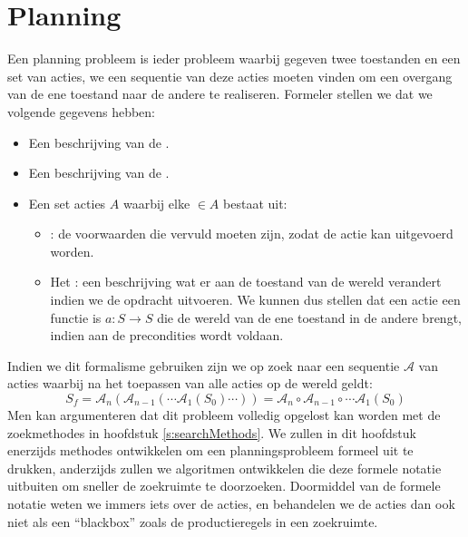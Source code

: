 \chapter{Planning}
\label{s:planning}
Een planning probleem is ieder probleem waarbij gegeven twee toestanden en een set van acties, we een sequentie van deze acties moeten vinden om een overgang van de ene toestand naar de andere te realiseren. Formeler stellen we dat we volgende gegevens hebben:
\begin{itemize}
 \item Een beschrijving van de .
 \item Een beschrijving van de .
 \item Een set acties $A$ waarbij elke  $\in A$ bestaat uit:
 \begin{itemize}
  \item {}: de voorwaarden die vervuld moeten zijn, zodat de actie kan uitgevoerd worden.
  \item Het : een beschrijving wat er aan de toestand van de wereld verandert indien we de opdracht uitvoeren.
 We kunnen dus stellen dat een actie een functie is $a:S\rightarrow S$ die de wereld van de ene toestand in de andere brengt, indien aan de precondities wordt voldaan.
 \end{itemize}
\end{itemize}
Indien we dit formalisme gebruiken zijn we op zoek naar een sequentie $\mathcal{A}$ van acties waarbij na het toepassen van alle acties op de wereld geldt:
\begin{equation}
S_f=\mathcal{A}_n\left(\mathcal{A}_{n-1}\left(\cdots \mathcal{A}_1\left(S_0\right)\cdots\right)\right)=\mathcal{A}_n\circ\mathcal{A}_{n-1}\circ\cdots\mathcal{A}_1\left(S_0\right)
\end{equation}
Men kan argumenteren dat dit probleem volledig opgelost kan worden met de zoekmethodes in hoofdstuk \ref{s:searchMethods}. We zullen in dit hoofdstuk enerzijds methodes ontwikkelen om een planningsprobleem formeel uit te drukken, anderzijds zullen we algoritmen ontwikkelen die deze formele notatie uitbuiten om sneller de zoekruimte te doorzoeken. Doormiddel van de formele notatie weten we immers iets over de acties, en behandelen we de acties dan ook niet als een ``blackbox'' zoals de productieregels in een zoekruimte.
